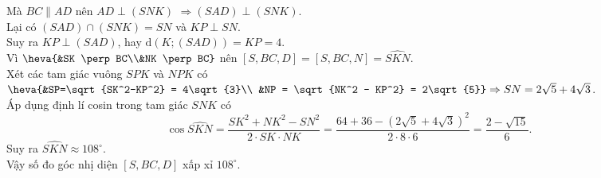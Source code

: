 \begin{ex}
{		Mà $BC \parallel AD$ nên $AD \perp (SNK)$ $\Rightarrow (SAD) \perp (SNK)$.\\
		Lại có $(SAD) \cap (SNK) = SN$ và $KP \perp SN$.\\
		Suy ra $KP \perp (SAD)$, hay $\mathrm{d}(K;(SAD)) = KP = 4$.\\
		Vì $\heva{&SK \perp BC\\&NK \perp BC}$ nên $[S,BC,D] = [S,BC,N] = \widehat{SKN}$.\\
		Xét các tam giác vuông $SPK$ và $NPK$ có $\heva{&SP=\sqrt{SK^2-KP^2} = 4\sqrt{3}\\ &NP = \sqrt{NK^2 - KP^2} = 2\sqrt{5}} \Rightarrow SN = 2\sqrt{5} + 4\sqrt{3}$.\\
		Áp dụng định lí cosin trong tam giác $SNK$ có
		\[\cos \widehat{SKN} = \dfrac{SK^2 + NK^2 - SN^2}{2\cdot SK \cdot NK} = \dfrac{64+36-\left(2\sqrt{5}+4\sqrt{3}\right)^2}{2\cdot 8 \cdot 6} = \dfrac{2-\sqrt{15}}{6}.\]
		Suy ra $\widehat{SKN} \approx 108^\circ$.\\
		Vậy số đo góc nhị diện $[S,BC,D]$ xấp xỉ $108^\circ$.
	}
\end{ex}

